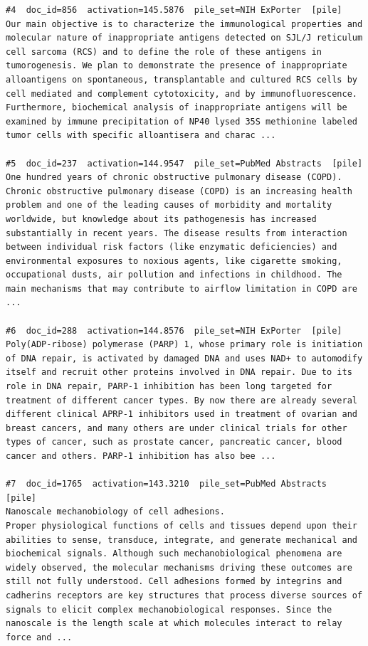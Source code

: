 \begin{verbatim}
#4  doc_id=856  activation=145.5876  pile_set=NIH ExPorter  [pile]
Our main objective is to characterize the immunological properties and molecular nature of inappropriate antigens detected on SJL/J reticulum cell sarcoma (RCS) and to define the role of these antigens in tumorogenesis. We plan to demonstrate the presence of inappropriate alloantigens on spontaneous, transplantable and cultured RCS cells by cell mediated and complement cytotoxicity, and by immunofluorescence. Furthermore, biochemical analysis of inappropriate antigens will be examined by immune precipitation of NP40 lysed 35S methionine labeled tumor cells with specific alloantisera and charac ...

#5  doc_id=237  activation=144.9547  pile_set=PubMed Abstracts  [pile]
One hundred years of chronic obstructive pulmonary disease (COPD).
Chronic obstructive pulmonary disease (COPD) is an increasing health problem and one of the leading causes of morbidity and mortality worldwide, but knowledge about its pathogenesis has increased substantially in recent years. The disease results from interaction between individual risk factors (like enzymatic deficiencies) and environmental exposures to noxious agents, like cigarette smoking, occupational dusts, air pollution and infections in childhood. The main mechanisms that may contribute to airflow limitation in COPD are ...

#6  doc_id=288  activation=144.8576  pile_set=NIH ExPorter  [pile]
Poly(ADP-ribose) polymerase (PARP) 1, whose primary role is initiation of DNA repair, is activated by damaged DNA and uses NAD+ to automodify itself and recruit other proteins involved in DNA repair. Due to its role in DNA repair, PARP-1 inhibition has been long targeted for treatment of different cancer types. By now there are already several different clinical APRP-1 inhibitors used in treatment of ovarian and breast cancers, and many others are under clinical trials for other types of cancer, such as prostate cancer, pancreatic cancer, blood cancer and others. PARP-1 inhibition has also bee ...

#7  doc_id=1765  activation=143.3210  pile_set=PubMed Abstracts  [pile]
Nanoscale mechanobiology of cell adhesions.
Proper physiological functions of cells and tissues depend upon their abilities to sense, transduce, integrate, and generate mechanical and biochemical signals. Although such mechanobiological phenomena are widely observed, the molecular mechanisms driving these outcomes are still not fully understood. Cell adhesions formed by integrins and cadherins receptors are key structures that process diverse sources of signals to elicit complex mechanobiological responses. Since the nanoscale is the length scale at which molecules interact to relay force and ...


\end{verbatim}
